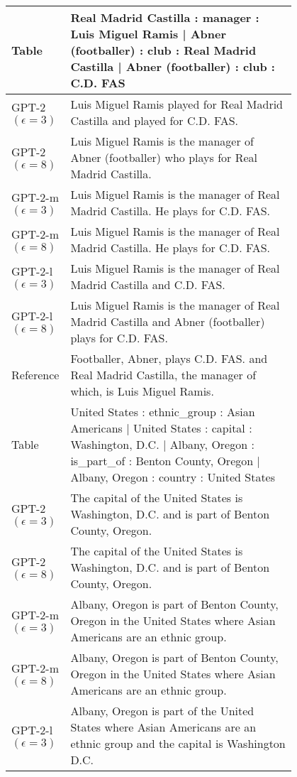 \begin{table}[h]
\centering
\renewcommand{\arraystretch}{1.2}
\footnotesize
\begin{tabular}{l | p{0.8\linewidth}}
\toprule
Table & Real Madrid Castilla : manager : Luis Miguel Ramis | Abner (footballer) : club : Real Madrid Castilla | Abner (footballer) : club : C.D. FAS  \\
 \hline
GPT-2 $(\epsilon=3)$ & Luis Miguel Ramis played for Real Madrid Castilla and played for C.D. FAS. \\
GPT-2 $(\epsilon=8)$ & Luis Miguel Ramis is the manager of Abner (footballer) who plays for Real Madrid Castilla. \\
GPT-2-m $(\epsilon=3)$ & Luis Miguel Ramis is the manager of Real Madrid Castilla. He plays for C.D. FAS. \\
GPT-2-m $(\epsilon=8)$ & Luis Miguel Ramis is the manager of Real Madrid Castilla. He plays for C.D. FAS. \\
GPT-2-l $(\epsilon=3)$ & Luis Miguel Ramis is the manager of Real Madrid Castilla and C.D. FAS. \\
GPT-2-l $(\epsilon=8)$ & Luis Miguel Ramis is the manager of Real Madrid Castilla and Abner (footballer) plays for C.D. FAS. \\
\hline
 Reference & Footballer, Abner, plays C.D. FAS. and Real Madrid Castilla, the manager of which, is Luis Miguel Ramis. \\
\midrule\midrule
Table & United States : ethnic\_group : Asian Americans | United States : capital : Washington, D.C. | Albany, Oregon : is\_part\_of : Benton County, Oregon | Albany, Oregon : country : United States  \\
 \hline
GPT-2 $(\epsilon=3)$ & The capital of the United States is Washington, D.C. and is part of Benton County, Oregon. \\
GPT-2 $(\epsilon=8)$ & The capital of the United States is Washington, D.C. and is part of Benton County, Oregon. \\
GPT-2-m $(\epsilon=3)$ & Albany, Oregon is part of Benton County, Oregon in the United States where Asian Americans are an ethnic group. \\
GPT-2-m $(\epsilon=8)$ & Albany, Oregon is part of Benton County, Oregon in the United States where Asian Americans are an ethnic group. \\
GPT-2-l $(\epsilon=3)$ & Albany, Oregon is part of the United States where Asian Americans are an ethnic group and the capital is Washington D.C. \\

\end{tabular}
\end{table}
